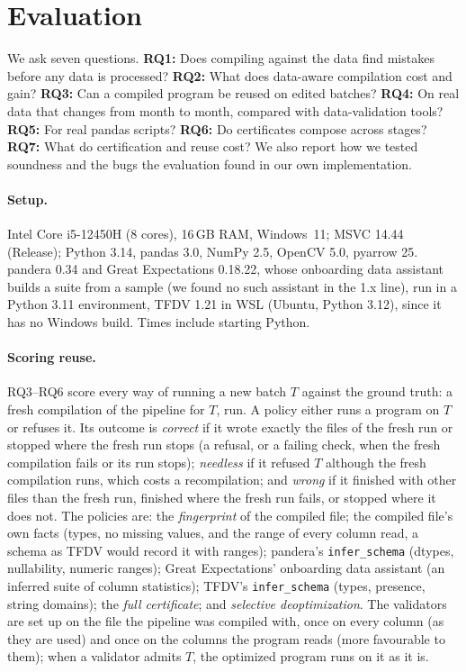 \section{Evaluation}\label{sec:eval}

We ask seven questions. \textbf{RQ1:} Does compiling against the data find mistakes before any data
is processed? \textbf{RQ2:} What does data-aware compilation cost and gain? \textbf{RQ3:} Can a
compiled program be reused on edited batches? \textbf{RQ4:} On real data that changes from month to
month, compared with data-validation tools? \textbf{RQ5:} For real pandas scripts? \textbf{RQ6:} Do
certificates compose across stages? \textbf{RQ7:} What do certification and reuse cost? We also report
how we tested soundness and the bugs the evaluation found in our own implementation.

\paragraph{Setup.} Intel Core i5-12450H (8 cores), 16\,GB RAM, Windows~11; MSVC 14.44 (Release);
Python 3.14, pandas 3.0, NumPy 2.5, OpenCV 5.0, pyarrow 25. pandera 0.34 and Great Expectations
0.18.22, whose onboarding data assistant builds a suite from a sample (we found no such assistant in
the 1.x line), run in a Python 3.11 environment, TFDV 1.21 in WSL (Ubuntu, Python 3.12), since it has
no Windows build. Times include starting Python.

\paragraph{Scoring reuse.} RQ3--RQ6 score every way of running a new batch $T$ against the ground
truth: a fresh compilation of the pipeline for $T$, run. A policy either runs a program on $T$ or
refuses it. Its outcome is \emph{correct} if it wrote exactly the files of the fresh run or stopped
where the fresh run stops (a refusal, or a failing check, when the fresh compilation fails or its run
stops); \emph{needless} if it refused $T$ although the fresh compilation runs, which costs a
recompilation; and \emph{wrong} if it finished with other files than the fresh run, finished where the
fresh run fails, or stopped where it does not. The policies are: the \emph{fingerprint} of the
compiled file; the compiled file's own facts (types, no missing values, and the range of every column
read, a schema as TFDV would record it with ranges); pandera's \texttt{infer\_schema} (dtypes,
nullability, numeric ranges); Great Expectations' onboarding data assistant (an inferred suite of
column statistics); TFDV's \texttt{infer\_schema} (types, presence, string domains); the \emph{full
certificate}; and \emph{selective deoptimization}. The validators are set up on the file the pipeline
was compiled with, once on every column (as they are used) and once on the columns the program reads
(more favourable to them); when a validator admits $T$, the optimized program runs on it as it is.

